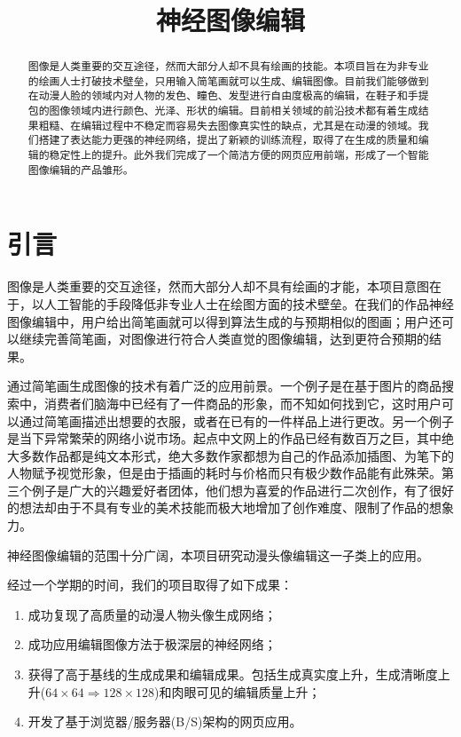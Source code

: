 \documentclass[a4paper,12pt,UTF8]{ctexart}
\title{神经图像编辑}
\begin{document}
\maketitle


\begin{abstract}

图像是人类重要的交互途径，然而大部分人却不具有绘画的技能。本项目旨在为非专业的绘画人士打破技术壁垒，只用输入简笔画就可以生成、编辑图像。目前我们能够做到在动漫人脸的领域内对人物的发色、瞳色、发型进行自由度极高的编辑，在鞋子和手提包的图像领域内进行颜色、光泽、形状的编辑。目前相关领域的前沿技术都有着生成结果粗糙、在编辑过程中不稳定而容易失去图像真实性的缺点，尤其是在动漫的领域。我们搭建了表达能力更强的神经网络，提出了新颖的训练流程，取得了在生成的质量和编辑的稳定性上的提升。此外我们完成了一个简洁方便的网页应用前端，形成了一个智能图像编辑的产品雏形。

\end{abstract}

\section{引言}

图像是人类重要的交互途径，然而大部分人却不具有绘画的才能，本项目意图在于，以人工智能的手段降低非专业人士在绘图方面的技术壁垒。在我们的作品神经图像编辑中，用户给出简笔画就可以得到算法生成的与预期相似的图画；用户还可以继续完善简笔画，对图像进行符合人类直觉的图像编辑，达到更符合预期的结果。

通过简笔画生成图像的技术有着广泛的应用前景。一个例子是在基于图片的商品搜索中，消费者们脑海中已经有了一件商品的形象，而不知如何找到它，这时用户可以通过简笔画描述出想要的衣服，或者在已有的一件样品上进行更改。另一个例子是当下异常繁荣的网络小说市场。起点中文网上的作品已经有数百万之巨，其中绝大多数作品都是纯文本形式，绝大多数作家都想为自己的作品添加插图、为笔下的人物赋予视觉形象，但是由于插画的耗时与价格而只有极少数作品能有此殊荣。第三个例子是广大的兴趣爱好者团体，他们想为喜爱的作品进行二次创作，有了很好的想法却由于不具有专业的美术技能而极大地增加了创作难度、限制了作品的想象力。




神经图像编辑的范围十分广阔，本项目研究动漫头像编辑这一子类上的应用。

经过一个学期的时间，我们的项目取得了如下成果：

\begin{enumerate}
  \item 成功复现了高质量的动漫人物头像生成网络；
  \item 成功应用编辑图像方法于极深层的神经网络；
  \item 获得了高于基线的生成成果和编辑成果。包括生成真实度上升，生成清晰度上升($64 \times 64 \Rightarrow 128 \times 128$)和肉眼可见的编辑质量上升；
  \item 开发了基于浏览器/服务器(B/S)架构的网页应用。
\end{enumerate}
\end{document}
